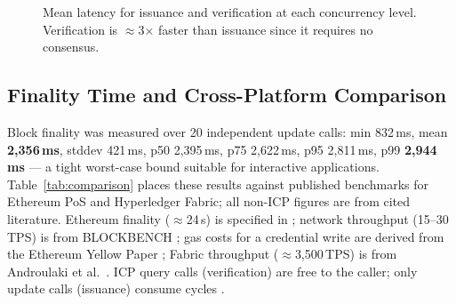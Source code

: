 \documentclass[conference]{IEEEtran}
\begin{document}
\begin{figure}[t]
\centering
{}
\caption{Mean latency for issuance and verification at each concurrency level. Verification is $\approx$3$\times$ faster than issuance since it requires no consensus.}
\label{fig:conc_lat}
\end{figure}

\subsection{Finality Time and Cross-Platform Comparison}

Block finality was measured over 20 independent update calls: min 832\,ms, mean \textbf{2{,}356\,ms}, stddev 421\,ms, p50 2{,}395\,ms, p75 2{,}622\,ms, p95 2{,}811\,ms, p99 \textbf{2{,}944\,ms} — a tight worst-case bound suitable for interactive applications. Table~\ref{tab:comparison} places these results against published benchmarks for Ethereum PoS and Hyperledger Fabric; all non-ICP figures are from cited literature. Ethereum finality ($\approx$24\,s) is specified in \cite{buterin2020eth2}; network throughput (15--30\,TPS) is from BLOCKBENCH \cite{dinh2017blockbench}; gas costs for a credential write are derived from the Ethereum Yellow Paper \cite{wood2014ethereum}; Fabric throughput ($\approx$3,500\,TPS) is from Androulaki et al.\ \cite{androulaki2018fabric}. ICP query calls (verification) are free to the caller; only update calls (issuance) consume cycles \cite{dfinity2022geeks}.
\end{document}
